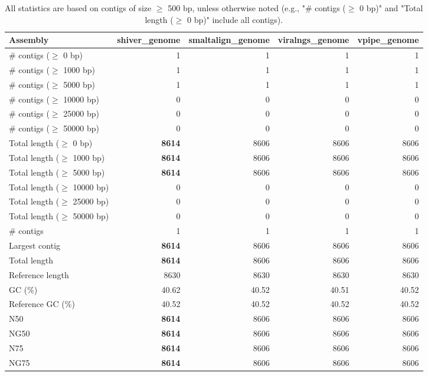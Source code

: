 \documentclass[12pt,a4paper]{article}
\begin{document}
\begin{table}[ht]
\begin{center}
\caption{All statistics are based on contigs of size $\geq$ 500 bp, unless otherwise noted (e.g., "\# contigs ($\geq$ 0 bp)" and "Total length ($\geq$ 0 bp)" include all contigs).}
\begin{tabular}{|l*{4}{|r}|}
\hline
Assembly & shiver\_genome & smaltalign\_genome & viralngs\_genome & vpipe\_genome \\ \hline
\# contigs ($\geq$ 0 bp) & 1 & 1 & 1 & 1 \\ \hline
\# contigs ($\geq$ 1000 bp) & 1 & 1 & 1 & 1 \\ \hline
\# contigs ($\geq$ 5000 bp) & 1 & 1 & 1 & 1 \\ \hline
\# contigs ($\geq$ 10000 bp) & 0 & 0 & 0 & 0 \\ \hline
\# contigs ($\geq$ 25000 bp) & 0 & 0 & 0 & 0 \\ \hline
\# contigs ($\geq$ 50000 bp) & 0 & 0 & 0 & 0 \\ \hline
Total length ($\geq$ 0 bp) & {\bf 8614} & 8606 & 8606 & 8606 \\ \hline
Total length ($\geq$ 1000 bp) & {\bf 8614} & 8606 & 8606 & 8606 \\ \hline
Total length ($\geq$ 5000 bp) & {\bf 8614} & 8606 & 8606 & 8606 \\ \hline
Total length ($\geq$ 10000 bp) & 0 & 0 & 0 & 0 \\ \hline
Total length ($\geq$ 25000 bp) & 0 & 0 & 0 & 0 \\ \hline
Total length ($\geq$ 50000 bp) & 0 & 0 & 0 & 0 \\ \hline
\# contigs & 1 & 1 & 1 & 1 \\ \hline
Largest contig & {\bf 8614} & 8606 & 8606 & 8606 \\ \hline
Total length & {\bf 8614} & 8606 & 8606 & 8606 \\ \hline
Reference length & 8630 & 8630 & 8630 & 8630 \\ \hline
GC (\%) & 40.62 & 40.52 & 40.51 & 40.52 \\ \hline
Reference GC (\%) & 40.52 & 40.52 & 40.52 & 40.52 \\ \hline
N50 & {\bf 8614} & 8606 & 8606 & 8606 \\ \hline
NG50 & {\bf 8614} & 8606 & 8606 & 8606 \\ \hline
N75 & {\bf 8614} & 8606 & 8606 & 8606 \\ \hline
NG75 & {\bf 8614} & 8606 & 8606 & 8606 \\ \hline

\end{tabular}
\end{center}
\end{table}
\end{document}
